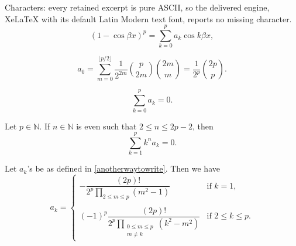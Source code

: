 \documentclass[10pt,a4paper]{amsart}
\begin{document}
Characters: every retained excerpt is pure ASCII, so the delivered engine, XeLaTeX with its default Latin Modern text font, reports no missing character.
\begin{equation}\label{anotherwaytowrite}
    (1-\cos \beta x)^p=\sum_{k=0}^pa_k\cos k\beta x,
\end{equation}

\begin{equation}\label{a0}
    a_0=\sum_{m=0}^{\lfloor p/2\rfloor}\frac{1}{2^{2m}}\binom{p}{2m}\binom{2m}{m}=\frac{1}{2^p}\binom{2p}{p}.
\end{equation}

\begin{equation}\label{easy}
    \sum_{k=0}^pa_k=0.
\end{equation}

\begin{lemma}\label{diffmanytimes}
Let $p\in\mathbb{N}$. If $n\in\mathbb{N}$ is even such that $2\le n\le 2p-2$, then
    \[\sum_{k=1}^pk^na_k=0.\]
\end{lemma}

\begin{theorem}\label{rmk5.3}
    Let $a_k$'s be as defined in \eqref{anotherwaytowrite}. Then we have
     \[a_k=\begin{cases}
			-\dfrac{(2p)!}{2^p\displaystyle\prod_{2\le m\le p}(m^2-1)}&\text{if }k=1,\\
			\\
			(-1)^p\dfrac{(2p)!}{2^p\displaystyle\prod_{\substack{0\leq m\leq p\\m\neq k}}(k^2-m^2)}&\text{if }2\leq k\leq p.
		\end{cases}\]
\end{theorem}
\end{document}
